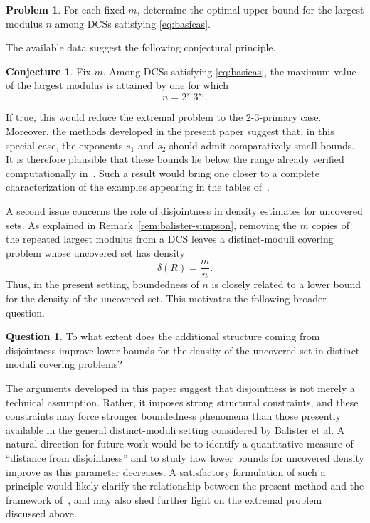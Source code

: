 \documentclass[11pt,reqno]{amsart}
\theoremstyle{definition}
\newtheorem{problem}[theorem]{Problem}
\newtheorem{question}[theorem]{Question}
\newtheorem{conjecture}[theorem]{Conjecture}
\begin{document}
\begin{problem}
For each fixed \(m\), determine the optimal upper bound for the largest modulus \(n\) among DCSs satisfying \eqref{eq:basicas}.
\end{problem}

The available data suggest the following conjectural principle.

\begin{conjecture}
Fix \(m\). Among DCSs satisfying \eqref{eq:basicas},
the maximum value of the largest modulus is attained by one for which
\[
n=2^{s_1}3^{s_2}.
\]
\end{conjecture}

If true, this would reduce the extremal problem to the \(2\)-\(3\)-primary case. 
Moreover, the methods developed in the present paper suggest that, in this special case, the exponents \(s_1\) and \(s_2\) should admit comparatively small bounds. 
It is therefore plausible that these bounds lie below the range already verified computationally in~\cite{EFZ}. 
Such a result would bring one closer to a complete characterization of the examples appearing in the tables of~\cite{EFZ}.

A second issue concerns the role of disjointness in density estimates for uncovered sets. 
As explained in Remark~\ref{rem:balister-simpson}, removing the \(m\) copies of the repeated largest modulus from a DCS leaves a distinct-moduli covering problem whose uncovered set has density
\[
\delta(R)=\frac{m}{n}.
\]
Thus, in the present setting, boundedness of 
\(n\) is closely related to a lower bound for the density of the uncovered set. This motivates the following broader question.

\begin{question}
To what extent does the additional structure coming from disjointness improve lower bounds for the density of the uncovered set in distinct-moduli covering problems?
\end{question}

The arguments developed in this paper suggest that disjointness is not merely a technical assumption. 
Rather, it imposes strong structural constraints, and these constraints may force stronger boundedness phenomena than those presently available in the general distinct-moduli setting considered by Balister et al. 
A natural direction for future work would be to identify a quantitative measure of ``distance from disjointness'' and to study how lower bounds for uncovered density improve as this parameter decreases. 
A satisfactory formulation of such a principle would likely clarify the relationship between the present method and the framework of~\cite{BBMST}, and may also shed further light on the extremal problem discussed above.
\end{document}

